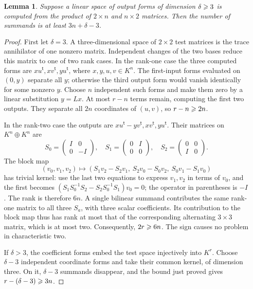 \documentclass[11pt,a4paper]{article}
\numberwithin{equation}{section}
\theoremstyle{plain}
\newtheorem{lemma}[theorem]{Lemma}
\theoremstyle{definition}
\begin{document}
\begin{lemma}\label{lem:partial}
Suppose a linear space of output forms of dimension $\delta\geqslant3$
is computed from the product of $2\times n$ and $n\times2$ matrices.
Then the number of summands is at least $3n+\delta-3$.
\end{lemma}
\begin{proof}
First let $\delta=3$. A three-dimensional space of $2\times2$ test
matrices is the trace annihilator of one nonzero matrix. Independent
changes of the two bases reduce this matrix to one of two rank cases.
In the rank-one case the three computed forms are
$x u^{\mathsf t},x v^{\mathsf t},y u^{\mathsf t}$, where $x,y,u,v\in K^n$.
The first-input forms evaluated on $(0,y)$ separate all $y$; otherwise
the third output form would vanish identically for some nonzero $y$.
Choose $n$ independent such forms and make them zero by a linear
substitution $y=Lx$. At most $r-n$ terms remain, computing the first
two outputs. They separate all $2n$ coordinates of $(u,v)$, so
$r-n\geqslant2n$.

In the rank-two case the outputs are
$x u^{\mathsf t}-y v^{\mathsf t},x v^{\mathsf t},y u^{\mathsf t}$.
Their matrices on $K^n\oplus K^n$ are
\[
 S_0=\begin{pmatrix}I&0\\0&-I\end{pmatrix},\quad
 S_1=\begin{pmatrix}0&I\\0&0\end{pmatrix},\quad
 S_2=\begin{pmatrix}0&0\\I&0\end{pmatrix}.
\]
The block map
\[
 (v_0,v_1,v_2)\longmapsto
 (S_1v_2-S_2v_1,\ S_2v_0-S_0v_2,\ S_0v_1-S_1v_0)
\]
has trivial kernel: use the last two equations to express $v_1,v_2$
in terms of $v_0$, and the first becomes
$(S_1S_0^{-1}S_2-S_2S_0^{-1}S_1)v_0=0$; the operator in parentheses
is $-I$. The rank is therefore $6n$.
A single bilinear summand contributes the same rank-one matrix to
all three $S_a$, with three scalar coefficients. Its contribution
to the block map thus has rank at most that of the corresponding
alternating $3\times3$ matrix, which is at most two.
Consequently, $2r\geqslant6n$. The sign causes no problem in characteristic two.

If $\delta>3$, the coefficient forms embed the test space injectively
into $K^r$. Choose $\delta-3$ independent coordinate forms and take
their common kernel, of dimension three. On it, $\delta-3$ summands
disappear, and the bound just proved gives
$r-(\delta-3)\geqslant3n$.
\end{proof}
\end{document}
